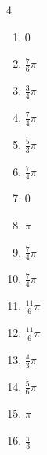 \begin{multicols}{4}
\begin{enumerate}
  \item $\displaystyle 0$

  \item $\displaystyle \frac{7}{6}\pi$

  \item $\displaystyle \frac{3}{4}\pi$

  \item $\displaystyle \frac{7}{4}\pi$

\columnbreak %

  \item $\displaystyle \frac{5}{3}\pi$

  \item $\displaystyle \frac{7}{4}\pi$

  \item $\displaystyle 0$

  \item $\displaystyle \pi$

  \item $\displaystyle \frac{7}{4}\pi$

  \item $\displaystyle \frac{7}{4}\pi$

  \item $\displaystyle \frac{11}{6}\pi$

  \item $\displaystyle \frac{11}{6}\pi$

  \item $\displaystyle \frac{4}{3}\pi$

  \item $\displaystyle \frac{5}{6}\pi$

  \item $\displaystyle \pi$

  \item $\displaystyle \frac{\pi}{3}$


\end{enumerate}
\end{multicols}
